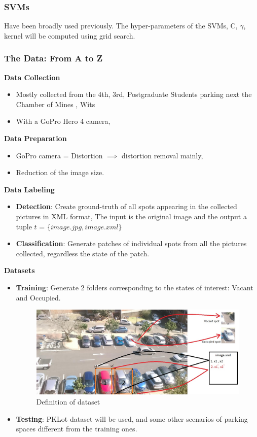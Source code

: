 \documentclass{beamer}
\begin{document}
\begin{frame}
\frametitle{SVMs}
Have been broadly used previously. The hyper-parameters of the SVMs, C, $\gamma$, kernel will be computed using grid search. 
\end{frame}


\begin{frame}[allowframebreaks]
\frametitle{The Data: From A to Z} 
\textbf{Data Collection}
\begin{itemize}
	\item Mostly collected from the 4th, 3rd, Postgraduate Students parking next the Chamber of Mines , Wits
	\item With a GoPro Hero 4 camera,
\end{itemize}
\textbf{Data Preparation}
\begin{itemize}
	\item GoPro camera = Distortion $\implies$ distortion removal mainly,
	\item Reduction of the image size.
\end{itemize}
\textbf{Data Labeling}
\begin{itemize}
	\item \textbf{Detection}: Create ground-truth of all spots appearing in the collected pictures  in XML format,
	The input is the original image and the output a tuple $t$ = $\lbrace image.jpg,image.xml\rbrace$
	\item \textbf{Classification}: Generate patches of individual spots from all the pictures collected, regardless the state of the patch.
\end{itemize}
\framebreak
\textbf{Datasets}
\begin{itemize}
	\item \textbf{Training}: Generate 2 folders corresponding to the states of interest: Vacant and Occupied.
	
	\begin{figure}
		\centering
		\includegraphics[width=0.8\linewidth]{Pictures/dataset}
		\caption{Definition of dataset}
		\label{rcnn_example}
	\end{figure}
	
	\item \textbf{Testing}: PKLot dataset will be used, and some other scenarios of parking spaces different from the training ones.
\end{itemize}

\end{frame}
\end{document}
